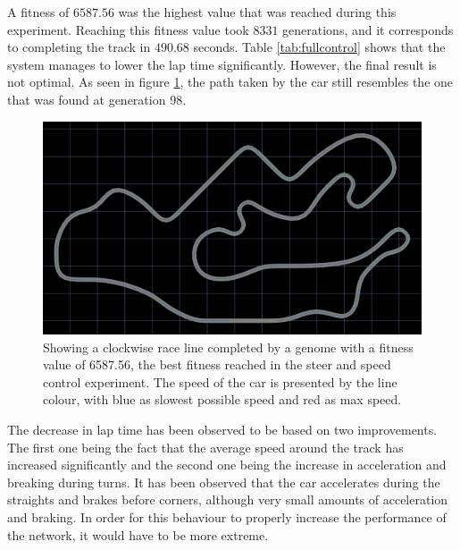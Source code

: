 A fitness of $6587.56$ was the highest value that was reached during this experiment. Reaching this fitness value took $8331$ generations, and it corresponds to completing the track in $490.68$ seconds. Table \ref{tab:fullcontrol} shows that the system manages to lower the lap time significantly. However, the final result is not optimal. As seen in figure \ref{fig:steerspeedline}, the path taken by the car still resembles the one that was found at generation 98.

\begin{figure}[h]
\includegraphics[width=\textwidth]{report/images/normal_generation_6558}
\centering
\caption{Showing a clockwise race line completed by a genome with a fitness value of 6587.56, the best fitness reached in the steer and speed control experiment. The speed of the car is presented by the line colour, with blue as slowest possible speed and red as max speed.}
\label{fig:steerspeedline}
\end{figure}

The decrease in lap time has been observed to be based on two improvements. The first one being the fact that the average speed around the track has increased significantly and the second one being the increase in acceleration and breaking during turns. It has been observed that the car accelerates during the straights and brakes before corners, although very small amounts of acceleration and braking. In order for this behaviour to properly increase the performance of the network, it would have to be more extreme.

 

